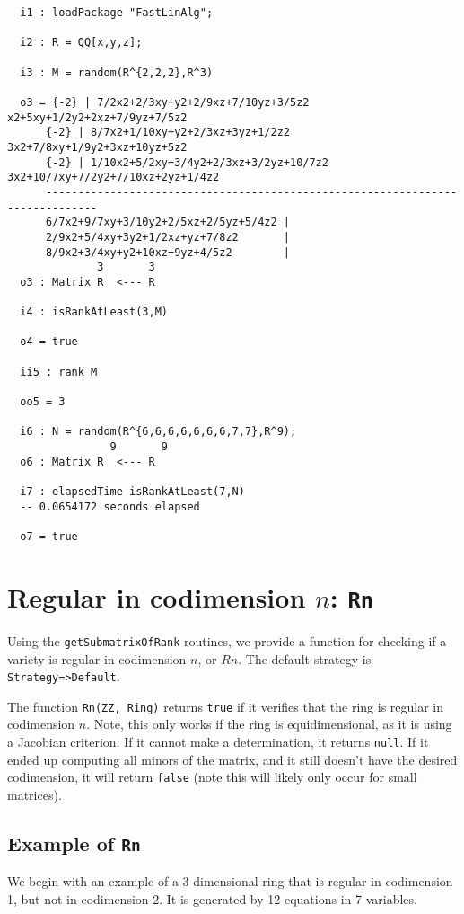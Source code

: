 \documentclass[11pt]{amsart}
\begin{document}
{\small\color{blue}
\begin{verbatim} 
  i1 : loadPackage "FastLinAlg";

  i2 : R = QQ[x,y,z];

  i3 : M = random(R^{2,2,2},R^3)

  o3 = {-2} | 7/2x2+2/3xy+y2+2/9xz+7/10yz+3/5z2     x2+5xy+1/2y2+2xz+7/9yz+7/5z2
      {-2} | 8/7x2+1/10xy+y2+2/3xz+3yz+1/2z2       3x2+7/8xy+1/9y2+3xz+10yz+5z2
      {-2} | 1/10x2+5/2xy+3/4y2+2/3xz+3/2yz+10/7z2 3x2+10/7xy+7/2y2+7/10xz+2yz+1/4z2
      ------------------------------------------------------------------------------
      6/7x2+9/7xy+3/10y2+2/5xz+2/5yz+5/4z2 |
      2/9x2+5/4xy+3y2+1/2xz+yz+7/8z2       |
      8/9x2+3/4xy+y2+10xz+9yz+4/5z2        |
              3       3
  o3 : Matrix R  <--- R

  i4 : isRankAtLeast(3,M)

  o4 = true

  ii5 : rank M

  oo5 = 3

  i6 : N = random(R^{6,6,6,6,6,6,6,7,7},R^9);
                9       9
  o6 : Matrix R  <--- R

  i7 : elapsedTime isRankAtLeast(7,N)
  -- 0.0654172 seconds elapsed

  o7 = true

\end{verbatim}
}

\section{Regular in codimension $n$: {\tt Rn}}
\label{sec.Rn}

Using the {\tt getSubmatrixOfRank} routines, we provide a function for checking if a variety is regular in codimension $n$, or $Rn$.  The default strategy is {\tt Strategy=>Default}.

The function {\tt Rn(ZZ, Ring)} returns {\tt true} if it verifies that the ring is regular in codimension $n$.  Note, this only works if the ring is equidimensional, as it is using a Jacobian criterion.  If it cannot make a determination, it returns {\tt null}.  If it ended up computing all minors of the matrix, and it still doesn't have the desired codimension, it will return {\tt false} (note this will likely only occur for small matrices).

\subsection{Example of {\tt Rn}}
We begin with an example of a 3 dimensional ring that is regular in codimension 1, but not in codimension 2.  It is generated by 12 equations in 7 variables.
\end{document}
